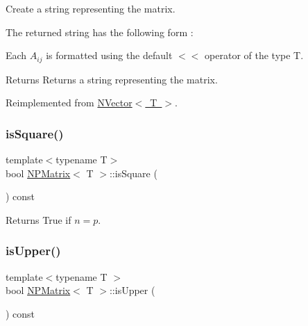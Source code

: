 Create a string representing the matrix. 

The returned string has the following form \+:


\begin{DoxyCode}{0}
\DoxyCodeLine{\textcolor{stringliteral}{"}}
\DoxyCodeLine{\textcolor{stringliteral}{(A(0,0), A(0,1), ..., A(0,(P-1)))}}
\DoxyCodeLine{\textcolor{stringliteral}{(A(1,0), A(1,1), ..., A(1,(P-1)))}}
\DoxyCodeLine{\textcolor{stringliteral}{(A(i,0), ..., A(i,j, Ai(P-1)))}}
\DoxyCodeLine{\textcolor{stringliteral}{(A((N-1),0), ..., ..., ...)}}
\DoxyCodeLine{\textcolor{stringliteral}{"}}
\end{DoxyCode}


Each $ A_{ij} $ is formatted using the default {\ttfamily $<$$<$} operator of the type {\ttfamily T}.

\begin{DoxyReturn}{Returns}
Returns a string representing the matrix. 
\end{DoxyReturn}


Reimplemented from \mbox{\hyperlink{class_n_vector_a6d66b06b953197c1b3965ed69f9fd17e}{N\+Vector$<$ T $>$}}.

\mbox{\label{class_n_p_matrix_af4d13e966823c2e132461df6b1ed7602}} 
\subsubsection{\texorpdfstring{isSquare()}{isSquare()}}
{\footnotesize\ttfamily template$<$typename T$>$ \\
bool \mbox{\hyperlink{class_n_p_matrix}{N\+P\+Matrix}}$<$ T $>$\+::is\+Square (\begin{DoxyParamCaption}{ }\end{DoxyParamCaption}) const\hspace{0.3cm}{\ttfamily [inline]}}

\begin{DoxyReturn}{Returns}
True if $ n = p $. 
\end{DoxyReturn}
\mbox{\label{class_n_p_matrix_aa1baeec21546add3c67f0d330c9d0016}} 
\subsubsection{\texorpdfstring{isUpper()}{isUpper()}}
{\footnotesize\ttfamily template$<$typename T $>$ \\
bool \mbox{\hyperlink{class_n_p_matrix}{N\+P\+Matrix}}$<$ T $>$\+::is\+Upper (\begin{DoxyParamCaption}{ }\end{DoxyParamCaption}) const}


